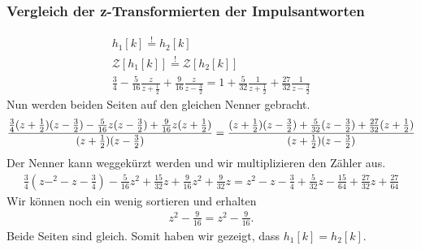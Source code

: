 \documentclass[11pt,a4paper,DIV=12]{scrartcl}
\begin{document}
\subsubsection*{Vergleich der z-Transformierten der Impulsantworten}
%
\begin{gather}
	h_1[k]\overset{!}{=}h_2[k]\\
	\mathcal{Z}[h_1[k]]\overset{!}{=}\mathcal{Z}[h_2[k]]\\
	\frac{3}{4}-\frac{5}{16}\frac{z}{z+\frac{1}{2}}+\frac{9}{16}\frac{z}{z-\frac{3}{2}}=1+\frac{5}{32}\frac{1}{z+\frac{1}{2}}+\frac{27}{32}\frac{1}{z-\frac{3}{2}}
\end{gather}
%
Nun werden beiden Seiten auf den gleichen Nenner gebracht.
%
\begin{gather}
	\frac{
		\frac{3}{4}(z+\frac{1}{2})(z-\frac{3}{2})-\frac{5}{16}z(z-\frac{3}{2})+\frac{9}{16}z(z+\frac{1}{2})
	}
	{
		(z+\frac{1}{2})(z-\frac{3}{2})
	}
	=\frac{
		(z+\frac{1}{2})(z-\frac{3}{2})+\frac{5}{32}(z-\frac{3}{2})+\frac{27}{32}(z+\frac{1}{2})
	}
	{
		(z+\frac{1}{2})(z-\frac{3}{2})
	}
\end{gather}
%
Der Nenner kann weggekürzt werden und wir multiplizieren den Zähler aus.
%
\begin{gather}
	\frac{3}{4}(z-^2-z-\frac{3}{4})-\frac{5}{16}z^2+\frac{15}{32}z+\frac{9}{16}z^2+\frac{9}{32}z
	=z^2-z-\frac{3}{4}+\frac{5}{32}z-\frac{15}{64}+\frac{27}{32}z+\frac{27}{64}
\end{gather}
%
Wir können noch ein wenig sortieren und erhalten
%
\begin{gather}
	z^2-\frac{9}{16}=z^2-\frac{9}{16}.
\end{gather}
%
Beide Seiten sind gleich. Somit haben wir gezeigt, dass $h_1[k]=h_2[k]$.
%
\renewcommand{\refname}{Buchzitate}
\clearpage

\end{document}
